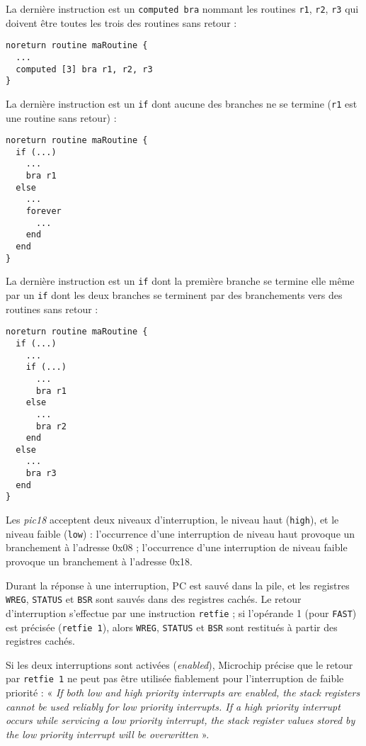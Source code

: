 La dernière instruction est un \texttt{computed bra} nommant les routines \texttt{r1}, \texttt{r2}, \texttt{r3} qui doivent être toutes les trois des routines sans retour :
\begin{lstlisting}[language=piccolo]
noreturn routine maRoutine {
  ...
  computed [3] bra r1, r2, r3
}
\end{lstlisting}

La dernière instruction est un \texttt{if} dont aucune des branches ne se termine (\texttt{r1} est une routine sans retour) :
\begin{lstlisting}[language=piccolo]
noreturn routine maRoutine {
  if (...)
    ...
    bra r1
  else
    ...
    forever
      ...
    end
  end
}

\end{lstlisting}


La dernière instruction est un \texttt{if} dont la première branche se termine elle même par un \texttt{if} dont les deux branches se terminent par des branchements vers des routines sans retour :
\begin{lstlisting}[language=piccolo]
noreturn routine maRoutine {
  if (...)
    ...
    if (...)
      ...
      bra r1
    else
      ...
      bra r2
    end
  else
    ...
    bra r3
  end
}
\end{lstlisting}









Les \emph{pic18} acceptent deux niveaux d’interruption, le niveau haut (\texttt{high}), et le niveau faible (\texttt{low}) :
l’occurrence d’une interruption de niveau haut provoque un branchement à l’adresse 0x08 ;
l’occurrence d’une interruption de niveau faible provoque un branchement à l’adresse 0x18.

Durant la réponse à une interruption, PC est sauvé dans la pile, et les registres \texttt{WREG}, \texttt{STATUS} et \texttt{BSR} sont sauvés dans des registres cachés. Le retour d’interruption s’effectue par une instruction \texttt{retfie} ; si l’opérande 1 (pour \texttt{FAST}) est précisée (\texttt{retfie 1}), alors \texttt{WREG}, \texttt{STATUS} et \texttt{BSR} sont restitués à partir des registres cachés.

Si les deux interruptions sont activées (\emph{enabled}), Microchip précise que le retour par \texttt{retfie 1} ne peut pas être utilisée fiablement pour l’interruption de faible priorité : « \emph{If both low and high priority interrupts are enabled, the stack registers cannot be used reliably for low priority interrupts. If a high priority interrupt occurs while servicing a low priority interrupt, the stack register values stored by the low priority interrupt will be overwritten} ».

